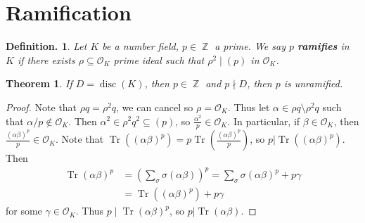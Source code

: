 \documentclass[11pt, a4paper]{memoir}
\DeclareMathOperator{\Z}{{\mathbb{Z}}}
\theoremstyle{change}
\newtheorem{theorem}{Theorem}[section]
\theoremstyle{plain}
\theoremstyle{nonumberplain}
\newtheorem{definition}{Definition.}
\newtheorem{proof}{Proof}
\DeclareMathOperator{\disc}{disc}
\DeclareMathOperator{\Tr}{Tr}
\begin{document}
\section{Ramification}
\begin{definition}
    Let $K$ be a number field, $p\in\Z$ a prime.
    We say $p$ \textbf{ramifies} in $K$ if there exists $\rho\subseteq\mathcal{O}_K$ prime ideal such that $\rho^2\mid(p)$ in $\mathcal{O}_K$.
\end{definition}
\begin{theorem}
    If $D=\disc(K)$, then $p\in\Z$ and $p\nmid D$, then $p$ is unramified.
\end{theorem}
\begin{proof}
    Note that $\rho q=\rho^2q$, we can cancel so $\rho=\mathcal{O}_K$.
    Thus let $\alpha\in\rho q\setminus\rho^2 q$ such that $\alpha/p\notin\mathcal{O}_K$.
    Then $\alpha^2\in\rho^2 q^2\subseteq(p)$, so $\frac{\alpha^2}{p}\in\mathcal{O}_K$.
    In particular, if $\beta\in\mathcal{O}_K$, then $\frac{(\alpha\beta)^p}{p}\in\mathcal{O}_K$.
    Note that $\Tr((\alpha\beta)^p)=p\Tr\left(\frac{(\alpha\beta)^p}{p}\right)$, so $p|\Tr((\alpha\beta)^p)$.
    Then
    \begin{align*}
        \Tr(\alpha\beta)^p &=\left(\sum_\sigma\sigma(\alpha\beta)\right)^p=\sum_\sigma\sigma(\alpha\beta)^p+p\gamma\\
                           &= \Tr((\alpha\beta)^p)+p\gamma
    \end{align*}
    for some $\gamma\in\mathcal{O}_K$.
    Thus $p\mid\Tr(\alpha\beta)^p$, so $p|\Tr(\alpha\beta)$.


\end{proof}
\end{document}
